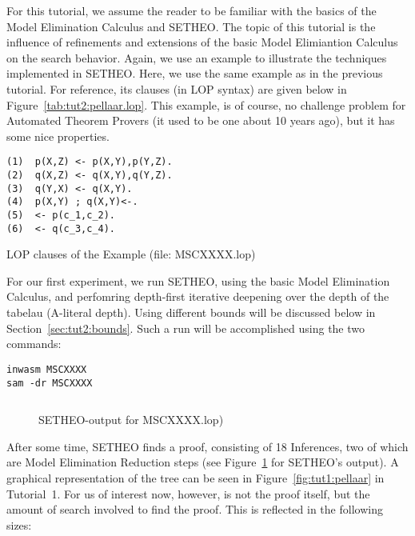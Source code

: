\def\SAM{SAM}

\newtheorem{definition}{Definition}

For this tutorial, we assume the reader to be familiar with the
basics of the Model Elimination Calculus and SETHEO. The topic
of this tutorial is the influence of refinements and extensions
of the basic Model Elimiantion Calculus on the search behavior.
Again, we use an example to illustrate the techniques implemented in
SETHEO. Here, we use the same example as in the previous tutorial.
For reference, its clauses (in LOP syntax) are given below in 
Figure~\ref{tab:tut2:pellaar.lop}. This example, is of course, no
challenge problem for Automated Theorem Provers
(it used to be one about 10 years ago), but it has some nice 
properties.


\begin{table}[htb]
\begin{center}
\begin{verbatim}
(1)  p(X,Z) <- p(X,Y),p(Y,Z).
(2)  q(X,Z) <- q(X,Y),q(Y,Z).
(3)  q(Y,X) <- q(X,Y).
(4)  p(X,Y) ; q(X,Y)<-.
(5)  <- p(c_1,c_2).
(6)  <- q(c_3,c_4).
\end{verbatim}
\end{center}
\caption{LOP clauses of the Example (file: MSCXXXX.lop)}
\label{tab:tut2:pellaar.lop}
\end{table}

For our first experiment, we run SETHEO, using the basic Model Elimination
Calculus, and perfomring depth-first iterative deepening over the
depth of the tabelau (A-literal depth). Using different bounds
will be discussed below in Section~\ref{sec:tut2:bounds}.
Such a run will be accomplished using the two commands:

\begin{center}
\begin{verbatim}
inwasm MSCXXXX
sam -dr MSCXXXX
\end{verbatim}
\end{center}

\begin{figure}[htb]
\begin{center}
\begin{verbatim}
\end{verbatim}
\end{center}
\caption{SETHEO-output for MSCXXXX.lop)}
\label{fig:tut2:pellaar.pure.log}
\end{figure}

After some time, SETHEO finds a proof, consisting of 18 Inferences,
two of which are Model Elimination Reduction steps
(see Figure~\ref{fig:tut2:pellaar.pure.log}  for SETHEO's output).
A graphical representation
of the tree can be seen in Figure~\ref{fig:tut1:pellaar} in Tutorial~1.
For us of interest now, however, is not the proof itself, but the amount
of search involved to find the proof.
This is reflected in the following sizes:

